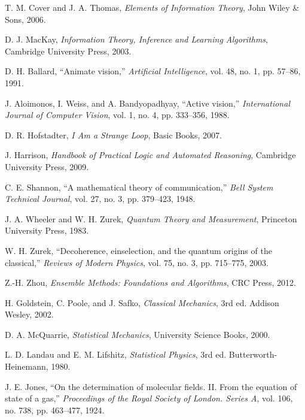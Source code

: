 \documentclass[11pt,a4paper]{article}
\begin{document}
\begin{thebibliography}{99}
T. M. Cover and J. A. Thomas, \textit{Elements of Information Theory}, John Wiley \& Sons, 2006.

D. J. MacKay, \textit{Information Theory, Inference and Learning Algorithms}, Cambridge University Press, 2003.

D. H. Ballard, ``Animate vision,'' \textit{Artificial Intelligence}, vol. 48, no. 1, pp. 57--86, 1991.

J. Aloimonos, I. Weiss, and A. Bandyopadhyay, ``Active vision,'' \textit{International Journal of Computer Vision}, vol. 1, no. 4, pp. 333--356, 1988.

D. R. Hofstadter, \textit{I Am a Strange Loop}, Basic Books, 2007.

J. Harrison, \textit{Handbook of Practical Logic and Automated Reasoning}, Cambridge University Press, 2009.

C. E. Shannon, ``A mathematical theory of communication,'' \textit{Bell System Technical Journal}, vol. 27, no. 3, pp. 379--423, 1948.

J. A. Wheeler and W. H. Zurek, \textit{Quantum Theory and Measurement}, Princeton University Press, 1983.

W. H. Zurek, ``Decoherence, einselection, and the quantum origins of the classical,'' \textit{Reviews of Modern Physics}, vol. 75, no. 3, pp. 715--775, 2003.

Z.-H. Zhou, \textit{Ensemble Methods: Foundations and Algorithms}, CRC Press, 2012.

H. Goldstein, C. Poole, and J. Safko, \textit{Classical Mechanics}, 3rd ed. Addison Wesley, 2002.

D. A. McQuarrie, \textit{Statistical Mechanics}, University Science Books, 2000.

L. D. Landau and E. M. Lifshitz, \textit{Statistical Physics}, 3rd ed. Butterworth-Heinemann, 1980.

J. E. Jones, ``On the determination of molecular fields. II. From the equation of state of a gas,'' \textit{Proceedings of the Royal Society of London. Series A}, vol. 106, no. 738, pp. 463--477, 1924.


\end{thebibliography}
\end{document}
